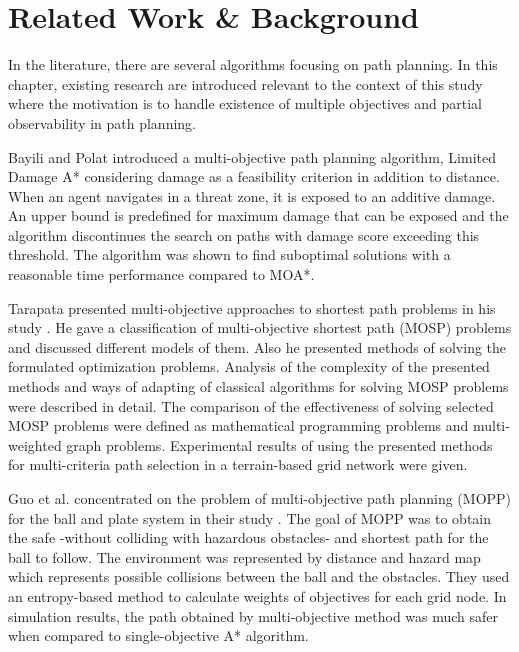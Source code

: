\chapter{Related Work \& Background}
\label{chapter:relatedwork}

In the literature, there are several algorithms focusing on path planning. In this chapter, existing research are introduced relevant to the context of this study where the motivation is to handle existence of multiple objectives and partial observability in path planning.

Bayili and Polat introduced a multi-objective path planning algorithm, Limited Damage A*  \cite{LDAStarBayili:2008} considering damage as a feasibility criterion in addition to distance. When an agent navigates in a threat zone, it is exposed to an additive damage. An upper bound is predefined for maximum damage that can be exposed and the algorithm discontinues the search on paths with damage score exceeding this threshold. The algorithm was shown to find suboptimal solutions with a reasonable time performance compared to MOA*. 

Tarapata presented multi-objective approaches to shortest path problems in his study \cite{Tarapata:2007}. He gave a classification of multi-objective shortest path (MOSP) problems and discussed different models of them. Also he presented methods of solving the formulated optimization problems. Analysis of the complexity of the presented methods and ways of adapting of classical algorithms for solving MOSP problems were described in detail. The comparison of the effectiveness of solving selected MOSP problems were defined as mathematical programming problems and multi-weighted graph problems. Experimental results of using the presented methods for multi-criteria path selection in a terrain-based grid network were given.

Guo et al. concentrated on the problem of multi-objective path planning (MOPP) for the ball and plate system in their study \cite{Guo:2009}. The goal of MOPP was to obtain the safe -without colliding with hazardous obstacles- and shortest path for the ball to follow. The environment was represented by distance and hazard map which represents possible collisions between the ball and the obstacles. They used an entropy-based method to calculate weights of objectives for each grid node. In simulation results, the path obtained by multi-objective method was much safer when compared to single-objective A* algorithm.

